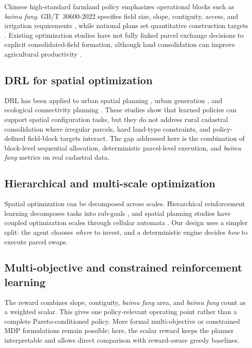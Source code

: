 \documentclass[preprint,12pt]{elsarticle}
\begin{document}
Chinese high-standard farmland policy emphasizes operational blocks such as \textit{baimu fang}. GB/T~30600-2022 specifies field size, slope, contiguity, access, and irrigation requirements \citep{gbt30600_2022}, while national plans set quantitative construction targets \citep{moa2021plan}. Existing optimization studies have not fully linked parcel exchange decisions to explicit consolidated-field formation, although land consolidation can improve agricultural productivity \citep{wu2005consolidation}.

\subsection{DRL for spatial optimization}

DRL has been applied to urban spatial planning \citep{zheng2023spatial}, urban generation \citep{wang2021deep}, and ecological connectivity planning \citep{equihua2024conservation}. These studies show that learned policies can support spatial configuration tasks, but they do not address rural cadastral consolidation where irregular parcels, hard land-type constraints, and policy-defined field-block targets interact. The gap addressed here is the combination of block-level sequential allocation, deterministic parcel-level execution, and \textit{baimu fang} metrics on real cadastral data.

\subsection{Hierarchical and multi-scale optimization}

Spatial optimization can be decomposed across scales. Hierarchical reinforcement learning decomposes tasks into sub-goals \citep{barto2003recent}, and spatial planning studies have coupled optimization scales through cellular automata \citep{li2011coupling}. Our design uses a simpler split: the agent chooses \textit{where} to invest, and a deterministic engine decides \textit{how} to execute parcel swaps.

\subsection{Multi-objective and constrained reinforcement learning}

The reward combines slope, contiguity, \textit{baimu fang} area, and \textit{baimu fang} count as a weighted scalar. This gives one policy-relevant operating point rather than a complete Pareto-conditioned policy. More formal multi-objective or constrained MDP formulations remain possible; here, the scalar reward keeps the planner interpretable and allows direct comparison with reward-aware greedy baselines.
\end{document}
